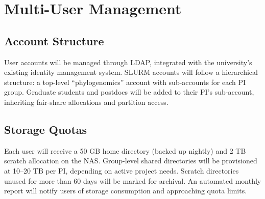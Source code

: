 \begin{table}[htbp]
\centering
\caption{Recommended Resource Requests by Analysis Type}
\end{table}

\section{Multi-User Management}

\subsection{Account Structure}

User accounts will be managed through LDAP, integrated with the university's existing identity management system. SLURM accounts will follow a hierarchical structure: a top-level ``phylogenomics'' account with sub-accounts for each PI group. Graduate students and postdocs will be added to their PI's sub-account, inheriting fair-share allocations and partition access.

\subsection{Storage Quotas}

Each user will receive a 50 GB home directory (backed up nightly) and 2 TB scratch allocation on the NAS. Group-level shared directories will be provisioned at 10--20 TB per PI, depending on active project needs. Scratch directories unused for more than 60 days will be marked for archival. An automated monthly report will notify users of storage consumption and approaching quota limits.


